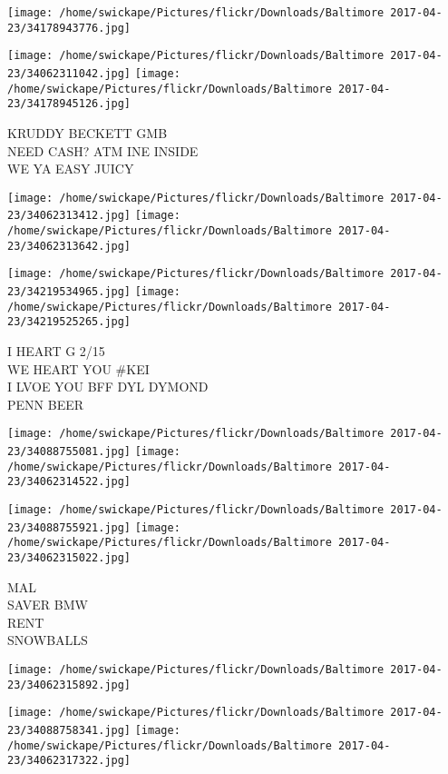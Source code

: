 \documentclass[10pt,letterpaper]{article}
\begin{document}
\texttt{[image: /home/swickape/Pictures/flickr/Downloads/Baltimore 2017-04-23/34178943776.jpg]}

\vspace{0.25in}
\texttt{[image: /home/swickape/Pictures/flickr/Downloads/Baltimore 2017-04-23/34062311042.jpg]}
\texttt{[image: /home/swickape/Pictures/flickr/Downloads/Baltimore 2017-04-23/34178945126.jpg]}

KRUDDY BECKETT GMB\\
NEED CASH?  ATM INE INSIDE\\
WE YA EASY JUICY
\pagebreak

\texttt{[image: /home/swickape/Pictures/flickr/Downloads/Baltimore 2017-04-23/34062313412.jpg]}
\texttt{[image: /home/swickape/Pictures/flickr/Downloads/Baltimore 2017-04-23/34062313642.jpg]}

\texttt{[image: /home/swickape/Pictures/flickr/Downloads/Baltimore 2017-04-23/34219534965.jpg]}
\texttt{[image: /home/swickape/Pictures/flickr/Downloads/Baltimore 2017-04-23/34219525265.jpg]}

I HEART G 2/15\\
WE HEART YOU \#KEI\\
I LVOE YOU BFF DYL DYMOND\\
PENN BEER
\pagebreak

\texttt{[image: /home/swickape/Pictures/flickr/Downloads/Baltimore 2017-04-23/34088755081.jpg]}
\texttt{[image: /home/swickape/Pictures/flickr/Downloads/Baltimore 2017-04-23/34062314522.jpg]}

\texttt{[image: /home/swickape/Pictures/flickr/Downloads/Baltimore 2017-04-23/34088755921.jpg]}
\texttt{[image: /home/swickape/Pictures/flickr/Downloads/Baltimore 2017-04-23/34062315022.jpg]}

MAL\\
SAVER BMW\\
RENT\\
SNOWBALLS
\pagebreak

\texttt{[image: /home/swickape/Pictures/flickr/Downloads/Baltimore 2017-04-23/34062315892.jpg]}

\vspace{0.25in}
\texttt{[image: /home/swickape/Pictures/flickr/Downloads/Baltimore 2017-04-23/34088758341.jpg]}
\texttt{[image: /home/swickape/Pictures/flickr/Downloads/Baltimore 2017-04-23/34062317322.jpg]}
\end{document}
